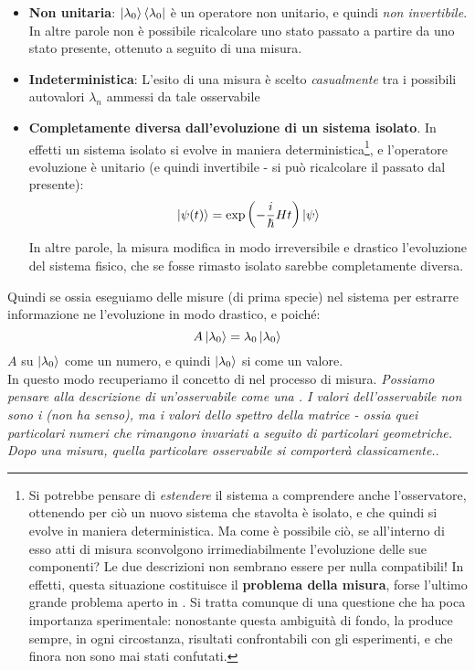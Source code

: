 \documentclass[../../FisicaTeorica.tex]{subfiles}
\begin{document}
\begin{itemize}
    \item \textbf{Non unitaria}: $\Ket{\lambda_0}\Bra{\lambda_0}$ è un operatore non unitario, e quindi \textit{non invertibile}. In altre parole non è possibile ricalcolare uno stato passato a partire da uno stato presente, ottenuto a seguito di una misura.
    \item \textbf{Indeterministica}: L'esito di una misura è scelto \textit{casualmente} tra i possibili autovalori $\lambda_n$ ammessi da tale osservabile
    \item \textbf{Completamente diversa dall'evoluzione di un sistema isolato}. In effetti un sistema isolato si evolve in maniera deterministica\footnote{Si potrebbe pensare di \textit{estendere} il sistema a comprendere anche l'osservatore, ottenendo per ciò un nuovo sistema che stavolta è isolato, e che quindi si evolve in maniera deterministica. Ma come è possibile ciò, se all'interno di esso atti di misura sconvolgono irrimediabilmente l'evoluzione delle sue componenti? Le due descrizioni non sembrano essere per nulla compatibili! In effetti, questa situazione costituisce il \textbf{problema della misura}, forse l'ultimo grande problema aperto in \MQ. Si tratta comunque di una questione che ha poca importanza sperimentale: nonostante questa ambiguità di fondo, la \MQ produce sempre, in ogni circostanza, risultati confrontabili con gli esperimenti, e che finora non sono mai stati confutati.}, e l'operatore evoluzione è unitario (e quindi invertibile - si può ricalcolare il passato dal presente):
    \[
    \Ket{\psi(t)}=\exp\left(-\frac{i}{\hbar}Ht\right)\Ket{\psi}
    \]
    In altre parole, la misura modifica in modo irreversibile e drastico l'evoluzione del sistema fisico, che se fosse rimasto isolato sarebbe completamente diversa.
\end{itemize}
Quindi se  ossia eseguiamo delle misure (di prima specie) nel sistema per estrarre informazione ne  l'evoluzione in modo drastico, e poiché:
\[
A\Ket{\lambda_0}=\lambda_0\Ket{\lambda_0}
\]
$A$ su $\Ket{\lambda_0}$  come un numero, e quindi $\Ket{\lambda_0}$ si  come un valore.\\
In questo modo recuperiamo il concetto di  nel processo di misura.%
\textit{Possiamo pensare alla descrizione di un'osservabile come una . I valori dell'osservabile non sono i  (non ha senso), ma i valori dello spettro della matrice - ossia quei particolari numeri che rimangono invariati a seguito di particolari  geometriche. Dopo una misura, quella particolare osservabile si comporterà \textit{classicamente}.}.\\
\end{document}
